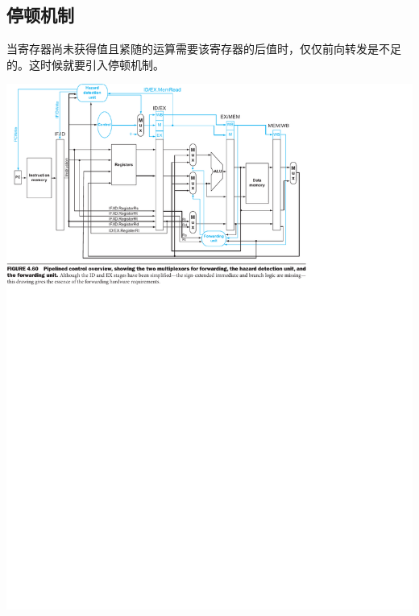 \documentclass[a4paper,UTF8]{ctexart}
\begin{document}

\subsection{停顿机制}

当寄存器尚未获得值且紧随的运算需要该寄存器的后值时，仅仅前向转发是不足的。这时候就要引入停顿机制。

\includegraphics[width=\textwidth]{stall.pdf}
\end{document}
